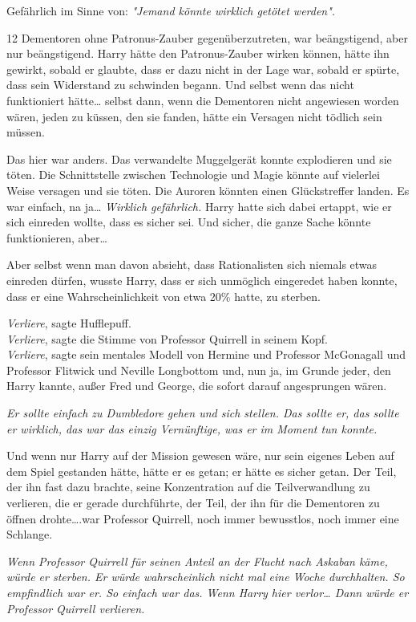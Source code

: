 {Gefährlich im Sinne von: \emph{"Jemand könnte wirklich getötet werden".}

12 Dementoren ohne Patronus-Zauber gegenüberzutreten, war beängstigend, aber nur beängstigend. Harry hätte den Patronus-Zauber wirken können, hätte ihn gewirkt, sobald er glaubte, dass er dazu nicht in der Lage war, sobald er spürte, dass sein Widerstand zu schwinden begann. Und selbst wenn das nicht funktioniert hätte… selbst dann, wenn die Dementoren nicht angewiesen worden wären, jeden zu küssen, den sie fanden, hätte ein Versagen nicht tödlich sein müssen.

Das hier war anders. Das verwandelte Muggelgerät konnte explodieren und sie töten. Die Schnittstelle zwischen Technologie und Magie könnte auf vielerlei Weise versagen und sie töten. Die Auroren könnten einen Glückstreffer landen. Es war einfach, na ja… \emph{Wirklich gefährlich.} Harry hatte sich dabei ertappt, wie er sich einreden wollte, dass es sicher sei. Und sicher, die ganze Sache könnte funktionieren, aber…

Aber selbst wenn man davon absieht, dass Rationalisten sich niemals etwas einreden dürfen, wusste Harry, dass er sich unmöglich eingeredet haben konnte, dass er eine Wahrscheinlichkeit von etwa 20\% hatte, zu sterben.

\emph{Verliere}, sagte Hufflepuff.\\ \emph{Verliere}, sagte die Stimme von Professor Quirrell in seinem Kopf.\\ \emph{Verliere}, sagte sein mentales Modell von Hermine und Professor McGonagall und Professor Flitwick und Neville Longbottom und, nun ja, im Grunde jeder, den Harry kannte, außer Fred und George, die sofort darauf angesprungen wären.

\emph{Er sollte einfach zu Dumbledore gehen und sich stellen. Das sollte er, das sollte er wirklich, das war das einzig Vernünftige, was er im Moment tun konnte.}

Und wenn nur Harry auf der Mission gewesen wäre, nur sein eigenes Leben auf dem Spiel gestanden hätte, hätte er es getan; er hätte es sicher getan. Der Teil, der ihn fast dazu brachte, seine Konzentration auf die Teilverwandlung zu verlieren, die er gerade durchführte, der Teil, der ihn für die Dementoren zu öffnen drohte….war Professor Quirrell, noch immer bewusstlos, noch immer eine Schlange.

\emph{Wenn Professor Quirrell für seinen Anteil an der Flucht nach Askaban käme, würde er sterben. Er würde wahrscheinlich nicht mal eine Woche durchhalten. So empfindlich war er. So einfach war das. Wenn Harry hier verlor… Dann würde er Professor Quirrell verlieren.}

}
